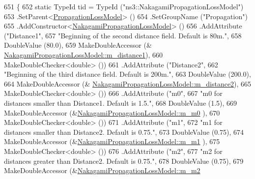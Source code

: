 \begin{DoxyCode}
651 \{
652   \textcolor{keyword}{static} TypeId tid = TypeId (\textcolor{stringliteral}{"ns3::NakagamiPropagationLossModel"})
653     .SetParent<\hyperlink{classns3_1_1PropagationLossModel_ace8b78c2c8e805cd0a919d7e3543318c}{PropagationLossModel}> ()
654     .SetGroupName (\textcolor{stringliteral}{"Propagation"})
655     .AddConstructor<\hyperlink{classns3_1_1NakagamiPropagationLossModel_a5d77ea9098f4f9a3b25d81d3e7699cd3}{NakagamiPropagationLossModel}> ()
656     .AddAttribute (\textcolor{stringliteral}{"Distance1"},
657                    \textcolor{stringliteral}{"Beginning of the second distance field. Default is 80m."},
658                    DoubleValue (80.0),
659                    MakeDoubleAccessor (&
      \hyperlink{classns3_1_1NakagamiPropagationLossModel_a4066585afe1a07e79bfc70bd64f06b80}{NakagamiPropagationLossModel::m\_distance1}),
660                    MakeDoubleChecker<double> ())
661     .AddAttribute (\textcolor{stringliteral}{"Distance2"},
662                    \textcolor{stringliteral}{"Beginning of the third distance field. Default is 200m."},
663                    DoubleValue (200.0),
664                    MakeDoubleAccessor (&
      \hyperlink{classns3_1_1NakagamiPropagationLossModel_a5b352f7546d5eb117c80bcc09fb76bca}{NakagamiPropagationLossModel::m\_distance2}),
665                    MakeDoubleChecker<double> ())
666     .AddAttribute (\textcolor{stringliteral}{"m0"},
667                    \textcolor{stringliteral}{"m0 for distances smaller than Distance1. Default is 1.5."},
668                    DoubleValue (1.5),
669                    MakeDoubleAccessor (&\hyperlink{classns3_1_1NakagamiPropagationLossModel_a188d8e524f49ac1dfcb56b7788807e6c}{NakagamiPropagationLossModel::m\_m0}
      ),
670                    MakeDoubleChecker<double> ())
671     .AddAttribute (\textcolor{stringliteral}{"m1"},
672                    \textcolor{stringliteral}{"m1 for distances smaller than Distance2. Default is 0.75."},
673                    DoubleValue (0.75),
674                    MakeDoubleAccessor (&\hyperlink{classns3_1_1NakagamiPropagationLossModel_aa233b3621162f0f006ca8d00ffb14bd6}{NakagamiPropagationLossModel::m\_m1}
      ),
675                    MakeDoubleChecker<double> ())
676     .AddAttribute (\textcolor{stringliteral}{"m2"},
677                    \textcolor{stringliteral}{"m2 for distances greater than Distance2. Default is 0.75."},
678                    DoubleValue (0.75),
679                    MakeDoubleAccessor (&\hyperlink{classns3_1_1NakagamiPropagationLossModel_ac4d82f72fb23d6cc852de0348c686fc2}{NakagamiPropagationLossModel::m\_m2}

\end{DoxyCode}
